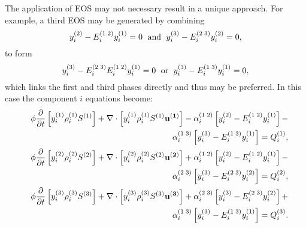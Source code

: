 The application of EOS may not necessary result in a unique approach. For example, a third EOS may be generated by combining 
\begin{displaymath}
   \mfr[y]{i}{2}-\mfr[E]{i}{1\;2}\mfr[y]{i}{1} = 0 \;\text{ and }\; \mfr[y]{i}{3}-\mfr[E]{i}{2\;3}\mfr[y]{i}{2} = 0,
\end{displaymath}
to form
\begin{displaymath}
   \mfr[y]{i}{3}-\mfr[E]{i}{2\;3}\mfr[E]{i}{1\;2}\mfr[y]{i}{1} = 0 \;\text{ or }\; \mfr[y]{i}{3}-\mfr[E]{i}{1\;3}\mfr[y]{i}{1} = 0,
\end{displaymath} 
which links the first and third phases directly and thus may be preferred. In this case the component $i$ equations become: 
     \begin{subequations}
        \begin{align}
            && \phi \frc{\partial}{\partial t} \left[ \mfr[y]{i}{1}\mfr[\rho]{i}{1}\mfr[S]{}{1} \right] + \nabla\cdot\left[\mfr[y]{i}{1}\mfr[\rho]{i}{1}\mfr[S]{}{1}\mathbf{\mfr[u]{}{1}}\right] - \mfr[\alpha]{i}{1\;2}\left[\mfr[y]{i}{2} - \mfr[E]{i}{1\;2} \mfr[y]{i}{1}\right] - \nonumber  \\
            && \mfr[\alpha]{i}{1\;3} \left[\mfr[y]{i}{3} - \mfr[E]{i}{1\;3} \mfr[y]{i}{1}\right] = \mfr[Q]{i}{1} , \label{phase1-comp-i'} \\ 
%
            && \phi \frc{\partial}{\partial t} \left[ \mfr[y]{i}{2}\mfr[\rho]{i}{2}\mfr[S]{}{2} \right] + \nabla\cdot\left[\mfr[y]{i}{2}\mfr[\rho]{i}{2}\mfr[S]{}{2}\mathbf{\mfr[u]{}{2}}\right] + \mfr[\alpha]{i}{1\;2}\left[\mfr[y]{i}{2} - \mfr[E]{i}{1\;2}\mfr[y]{i}{1}\right] - \nonumber \\
            && \mfr[\alpha]{i}{2\;3} \left[\mfr[y]{i}{3} - \mfr[E]{i}{2\;3} \mfr[y]{i}{2} \right] = \mfr[Q]{i}{2} , \label{phase2-comp-i'} \\
%
            && \phi \frc{\partial}{\partial t} \left[ \mfr[y]{i}{3}\mfr[\rho]{i}{3}\mfr[S]{}{3} \right] + \nabla\cdot\left[\mfr[y]{i}{3}\mfr[\rho]{i}{3}\mfr[S]{}{3}\mathbf{\mfr[u]{}{3}}\right] + \mfr[\alpha]{i}{2\;3}\left[\mfr[y]{i}{3} - \mfr[E]{i}{2\;3}\mfr[y]{i}{2}\right] + \nonumber \\
            && \mfr[\alpha]{i}{1\;3} \left[\mfr[y]{i}{3} - \mfr[E]{i}{1\;3} \mfr[y]{i}{1}\right] = \mfr[Q]{i}{3}  . \label{phase3-comp-i'}
        \end{align}
     \end{subequations}


